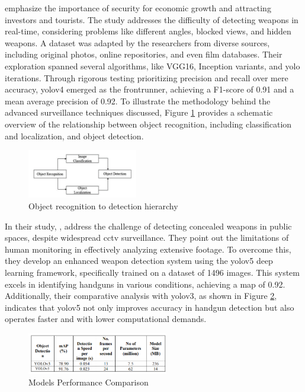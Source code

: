 \citet{rfc4} emphasize the importance of security for economic growth and attracting investors and tourists. The study addresses the difficulty of detecting weapons in real-time, considering problems like different angles, blocked views, and hidden weapons. A dataset was adapted by the researchers from diverse sources, including original photos, online repositories, and even film databases. Their exploration spanned several algorithms, like VGG16, Inception variants, and \ac{yolo} iterations. Through rigorous testing prioritizing precision and recall over mere accuracy, \ac{yolo}v4 emerged as the frontrunner, achieving a F1-score of 0.91 and a mean average precision of 0.92. To illustrate the methodology behind the advanced surveillance techniques discussed, Figure \ref{fig:bhatti-chart} provides a schematic overview of the relationship between object recognition, including classification and localization, and object detection.

\begin{figure}[ht]
    \centering 
    \includegraphics[width=0.43\textwidth]{figs/bhatti-chart.png} 
    \caption{Object recognition to detection hierarchy \cite{rfc4}}
    \label{fig:bhatti-chart}
\end{figure}

In their study, \citet{rfc5}, address the challenge of detecting concealed weapons in public spaces, despite widespread \ac{cctv} surveillance. They point out the limitations of human monitoring in effectively analyzing extensive footage. To overcome this, they develop an enhanced weapon detection system using the \ac{yolo}v5 deep learning framework, specifically trained on a dataset of 1496 images. This system excels in identifying handguns in various conditions, achieving a \ac{map} of 0.92. Additionally, their comparative analysis with \ac{yolo}v3, as shown in Figure \ref{fig:performance-Thangaraj}, indicates that \ac{yolo}v5 not only improves accuracy in handgun detection but also operates faster and with lower computational demands.

\begin{figure}[h]
    \centering 
    \includegraphics[width=0.55\textwidth]{figs/performance-Thangaraj.png} 
    \caption{Models Performance Comparison \cite{rfc5}}
    \label{fig:performance-Thangaraj}
\end{figure}

